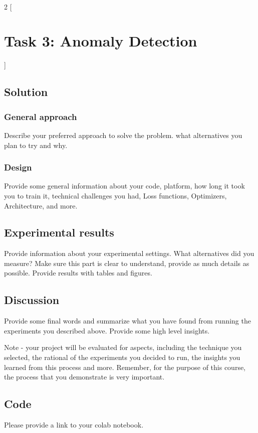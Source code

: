 \documentclass{article}
\begin{document}
\
\begin{multicols}{2}
[
\section{\centering Task 3: Anomaly Detection}
]
\subsection{Solution}
\subsubsection{General approach}
Describe your preferred approach to solve the problem. what alternatives you plan to try and why. 

\subsubsection{Design}
Provide some general information about your code, platform, how long it took you to train it, technical challenges you had, Loss functions, Optimizers, Architecture, and more.

\subsection{Experimental results}
Provide information about your experimental settings. What alternatives did you measure? Make sure this part is clear to understand, provide as much details as possible. Provide results with tables and figures.

\subsection{Discussion}
Provide some final words and summarize what you have found from running the experiments you described above. Provide some high level insights.

Note - your project will be evaluated for aspects, including the technique you selected, the rational of the experiments you decided to run, the insights you learned from this process and more. Remember, for the purpose of this course, the process that you demonstrate is very  important.

\subsection{Code}

Please provide a link to your colab notebook.

\end{multicols}
\end{document}
